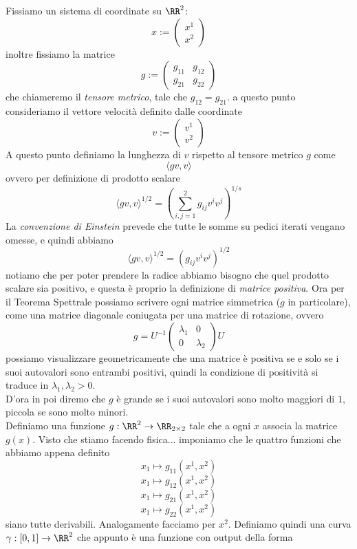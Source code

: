 \documentclass[11pt]{scrartcl}
\begin{document}
	 Fissiamo un sistema di coordinate su $\RR^2$:
	 $$x:=\begin{pmatrix}
	 	x^1 \\
	 	x^2
	 \end{pmatrix}$$
	 inoltre fissiamo la matrice 
	 $$g:=\begin{pmatrix}
	 	g_{11} & g_{12} \\
	 	g_{21} & g_{22}
	 \end{pmatrix}$$
	 che chiameremo il \textit{tensore metrico}, tale che $g_{12}=g_{21}$.
	 a questo punto consideriamo il vettore velocità definito dalle coordinate
	 $$v:=\begin{pmatrix}
	 	v^1 \\
	 	v^2
	 \end{pmatrix}$$
	 A questo punto definiamo la lunghezza di $v$ rispetto al tensore metrico $g$ come
	 $$\langle gv,v\rangle$$
	 ovvero per definizione di prodotto scalare
	 $$\langle gv,v\rangle^{1/2} = \left(\sum_{i,j=1}^{2}g_{ij}v^i v^j\right)^{1/s}$$
	 La \textit{convenzione di Einstein} prevede che tutte le somme su pedici iterati vengano omesse, e quindi abbiamo
	 $$\langle gv,v \rangle^{1/2}=\left(g_{ij}v^i v^j\right)^{1/2}$$
	 notiamo che per poter prendere la radice abbiamo bisogno che quel prodotto scalare sia positivo, e questa è proprio la definizione di \textit{matrice positiva}. Ora per il Teorema Spettrale possiamo scrivere ogni matrice simmetrica ($g$ in particolare), come una matrice diagonale coniugata per una matrice di rotazione, ovvero
	 $$g=U^{-1}\begin{pmatrix}
	 	\lambda_1 & 0 \\
	 	0 & \lambda_2
	 \end{pmatrix}U$$
	 possiamo visualizzare geometricamente che una matrice è positiva se e solo se i suoi autovalori sono entrambi positivi, quindi la condizione di positività si traduce in $\lambda_1,\lambda_2>0$. \\ 
	 D'ora in poi diremo che $g$ è grande se i suoi autovalori sono molto maggiori di $1$, piccola se sono molto minori. \\
	 Definiamo una funzione $g:\RR^2\to \RR_{2\times 2}$ tale che a ogni $x$ associa la matrice $g(x)$. Visto che stiamo facendo fisica... imponiamo che le quattro funzioni che abbiamo appena definito 
	 $$x_1\mapsto g_{11}(x^1,x^2)$$ 
	 $$x_1\mapsto g_{12}(x^1,x^2)$$
	 $$x_1\mapsto g_{21}(x^1,x^2)$$
	 $$x_1\mapsto g_{22}(x^1,x^2)$$
	 siano tutte derivabili. Analogamente facciamo per $x^2$. Definiamo quindi una curva $\gamma:[0,1]\to \RR^2$ che appunto è una funzione con output della forma
\end{document}
